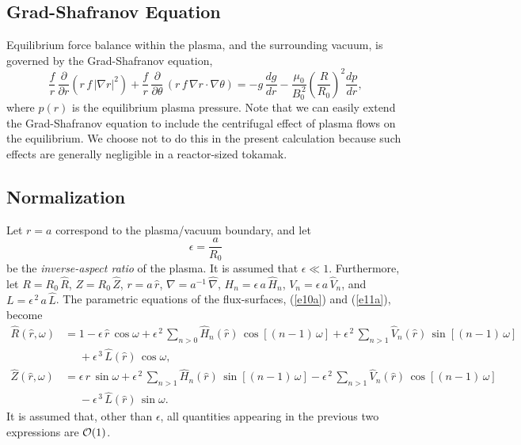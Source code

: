 \documentclass[12pt,prb,aps]{revtex4-1}
\begin{document}
\subsection{Grad-Shafranov Equation}\label{gs1}
Equilibrium force balance within the plasma, and the surrounding vacuum,  is governed by the Grad-Shafranov equation,\cite{con0,con,fitz93,greene,gim}
\begin{equation}\label{gs}
\frac{f}{r}\,\frac{\partial}{\partial r}(r\,f\,|\nabla r|^2)+\frac{f}{r}\,\frac{\partial}{\partial\theta}\,(r\,f\,\nabla r\cdot\nabla\theta)
=- g\,\frac{dg}{dr} - \frac{\mu_0}{B_0^{\,2}}\left(\frac{R}{R_0}\right)^2\frac{dp}{dr},
\end{equation}
where $p(r)$ is the equilibrium plasma pressure. Note that we can easily extend the Grad-Shafranov equation to include the centrifugal
effect of plasma flows on the  equilibrium.\cite{flow,flow1} We choose not to do this in the present calculation because such effects are
generally negligible in a  reactor-sized tokamak. 

\subsection{Normalization}
Let $r=a$ correspond to the plasma/vacuum boundary, and let 
\begin{equation}
\epsilon=\frac{a}{R_0}
\end{equation}
 be the {\em inverse-aspect ratio}\/ of the plasma.  It is assumed that $\epsilon\ll 1$. 
Furthermore, let $R=R_0\,\hat{R}$, $Z=R_0\,\hat{Z}$, $r=a\,\hat{r}$, $\nabla = a^{-1}\,\hat{\nabla}$,
 $H_n=\epsilon\,a\,\hat{H}_n$, $V_n=\epsilon\,a\,\hat{V}_n$, and $L=\epsilon^{\,2}\,a\,\hat{L}$. The parametric equations of the flux-surfaces, (\ref{e10a}) and (\ref{e11a}),  become\,\cite{fitz93,gim}
\begin{align}
\hat{R}(\hat{r},\omega) &= 1 -\epsilon\,\hat{r}\,\cos\omega + \epsilon^{\,2}\,\sum_{n>0}\hat{H}_n(\hat{r})\,\cos[(n-1)\,\omega] + \epsilon^{\,2}\,\sum_{n>1}\hat{V}_n(\hat{r})\,\sin[(n-1)\,\omega] \nonumber\\[0.5ex]
&\phantom{=}+\epsilon^{\,3}\,\hat{L}(\hat{r})\,\cos\omega,\label{e19x}\\[0.5ex]
\hat{Z}(\hat{r},\omega)&= \epsilon\,\hat{r}\,\sin\omega +\epsilon^{\,2}\,\sum_{n>1}\hat{H}_n(\hat{r})\,\sin[(n-1)\,\omega]
-\epsilon^{\,2}\,\sum_{n>1}\hat{V}_n(\hat{r})\,\cos[(n-1)\,\omega]\nonumber\\[0.5ex]&\phantom{=}-\epsilon^{\,3}\,\hat{L}(\hat{r})\,\sin\omega.\label{e20x}
\end{align}
It is assumed that, other than $\epsilon$,  all quantities appearing in the previous two expressions are ${\cal O}(1)$. 
\end{document}
